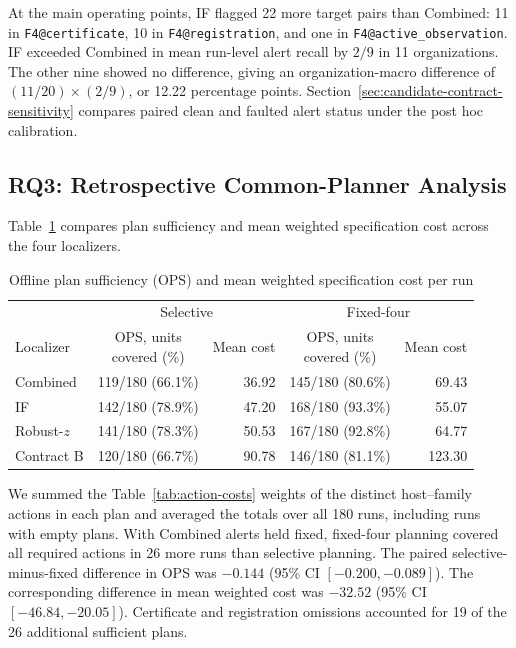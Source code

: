 \documentclass[sn-basic]{sn-jnl}%
\theoremstyle{thmstyleone}%
\theoremstyle{thmstyletwo}%
\theoremstyle{thmstylethree}%
\begin{document}
At the main operating points, IF flagged 22 more target pairs than Combined: 11 in \texttt{F4@certificate}, 10 in \texttt{F4@registration}, and one in \texttt{F4@active\_observation}. IF exceeded Combined in mean run-level alert recall by \(2/9\) in 11 organizations. The other nine showed no difference, giving an organization-macro difference of \((11/20)\times(2/9)\), or 12.22 percentage points. Section~\ref{sec:candidate-contract-sensitivity} compares paired clean and faulted alert status under the post hoc calibration.

\subsection{RQ3: Retrospective Common-Planner Analysis}
\label{sec:rq3-results}

Table~\ref{tab:common-planner} compares plan sufficiency and mean weighted specification cost across the four localizers.

\begin{table}[htbp]
\centering
\caption{Offline plan sufficiency (OPS) and mean weighted specification cost per run}
\label{tab:common-planner}
\small
\setlength{\tabcolsep}{4pt}
\renewcommand{\arraystretch}{1.1}
\begin{tabular*}{\linewidth}{@{\extracolsep{\fill}}lcrcr@{}}
\toprule
& \multicolumn{2}{c}{Selective}
& \multicolumn{2}{c}{Fixed-four} \\
\cmidrule(lr){2-3}\cmidrule(l){4-5}
Localizer & \shortstack{OPS, units\\covered (\%)} & Mean cost
          & \shortstack{OPS, units\\covered (\%)} & Mean cost \\
\midrule
Combined     & 119/180 (66.1\%) & 36.92 & 145/180 (80.6\%) &  69.43 \\
IF           & 142/180 (78.9\%) & 47.20 & 168/180 (93.3\%) &  55.07 \\
Robust-\(z\) & 141/180 (78.3\%) & 50.53 & 167/180 (92.8\%) &  64.77 \\
Contract B   & 120/180 (66.7\%) & 90.78 & 146/180 (81.1\%) & 123.30 \\
\bottomrule
\end{tabular*}
\end{table}

We summed the Table~\ref{tab:action-costs} weights of the distinct host--family actions in each plan and averaged the totals over all 180 runs, including runs with empty plans. With Combined alerts held fixed, fixed-four planning covered all required actions in 26 more runs than selective planning. The paired selective-minus-fixed difference in OPS was \(-0.144\) (95\% CI \([-0.200, -0.089]\)). The corresponding difference in mean weighted cost was \(-32.52\) (95\% CI \([-46.84, -20.05]\)). Certificate and registration omissions accounted for 19 of the 26 additional sufficient plans.
\end{document}
